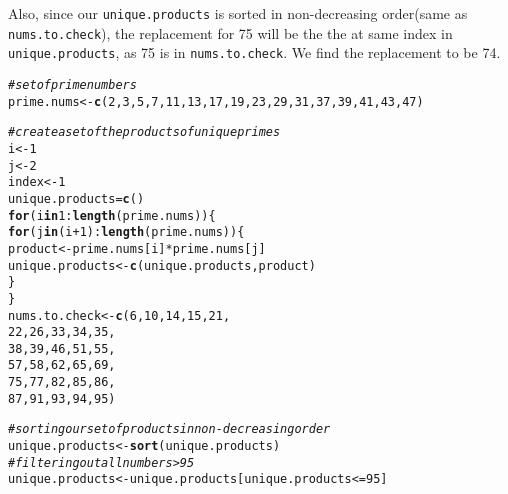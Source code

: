 \documentclass{article}\usepackage[]{graphicx}\usepackage[]{xcolor}
\makeatletter
\newcommand{\hlnum}[1]{\textcolor[rgb]{0.686,0.059,0.569}{#1}}%
\newcommand{\hlcom}[1]{\textcolor[rgb]{0.678,0.584,0.686}{\textit{#1}}}%
\newcommand{\hlopt}[1]{\textcolor[rgb]{0,0,0}{#1}}%
\newcommand{\hldef}[1]{\textcolor[rgb]{0.345,0.345,0.345}{#1}}%
\newcommand{\hlkwa}[1]{\textcolor[rgb]{0.161,0.373,0.58}{\textbf{#1}}}%
\newcommand{\hlkwb}[1]{\textcolor[rgb]{0.69,0.353,0.396}{#1}}%
\newcommand{\hlkwd}[1]{\textcolor[rgb]{0.737,0.353,0.396}{\textbf{#1}}}%
\newenvironment{kframe}{%
 \def\at@end@of@kframe{}%
 \ifinner\ifhmode%
  \def\at@end@of@kframe{\end{minipage}}%
  \begin{minipage}{\columnwidth}%
 \fi\fi%
 \def\FrameCommand##1{\hskip\@totalleftmargin \hskip-\fboxsep
 \colorbox{shadecolor}{##1}\hskip-\fboxsep
     \hskip-\linewidth \hskip-\@totalleftmargin \hskip\columnwidth}%
 \MakeFramed {\advance\hsize-\width
   \@totalleftmargin\z@ \linewidth\hsize
   \@setminipage}}%
 {\par\unskip\endMakeFramed%
 \at@end@of@kframe}
\newenvironment{knitrout}{}{} %
\makeatother
\begin{document}
\begin{enumerate}
Also, since our \texttt{unique.products} is sorted in non-decreasing order(same as \texttt{nums.to.check}), the replacement for 75 will be the the at same index in \texttt{unique.products}, as 75 is in \texttt{nums.to.check}. We find the replacement to be 74.

\begin{knitrout}\scriptsize
{}\color{fgcolor}\begin{kframe}
\begin{alltt}
\hlcom{#set of prime numbers}
\hldef{prime.nums} \hlkwb{<-} \hlkwd{c}\hldef{(}\hlnum{2}\hldef{,} \hlnum{3}\hldef{,} \hlnum{5}\hldef{,} \hlnum{7}\hldef{,} \hlnum{11}\hldef{,} \hlnum{13}\hldef{,} \hlnum{17}\hldef{,} \hlnum{19}\hldef{,} \hlnum{23}\hldef{,} \hlnum{29}\hldef{,} \hlnum{31}\hldef{,} \hlnum{37}\hldef{,} \hlnum{39}\hldef{,} \hlnum{41}\hldef{,} \hlnum{43}\hldef{,} \hlnum{47}\hldef{)}

\hlcom{#create a set of the products of unique primes}
\hldef{i} \hlkwb{<-} \hlnum{1}
\hldef{j} \hlkwb{<-} \hlnum{2}
\hldef{index} \hlkwb{<-} \hlnum{1}
\hldef{unique.products} \hlkwb{=} \hlkwd{c}\hldef{()}
\hlkwa{for} \hldef{(i} \hlkwa{in} \hlnum{1}\hlopt{:}\hlkwd{length}\hldef{(prime.nums))\{}
  \hlkwa{for} \hldef{(j} \hlkwa{in} \hldef{(i}\hlopt{+}\hlnum{1}\hldef{)}\hlopt{:}\hlkwd{length}\hldef{(prime.nums))\{}
    \hldef{product} \hlkwb{<-} \hldef{prime.nums[i]} \hlopt{*} \hldef{prime.nums[j]}
    \hldef{unique.products} \hlkwb{<-} \hlkwd{c}\hldef{(unique.products, product)}
  \hldef{\}}
\hldef{\}}
\hldef{nums.to.check}  \hlkwb{<-} \hlkwd{c}\hldef{(} \hlnum{6}\hldef{,} \hlnum{10}\hldef{,} \hlnum{14}\hldef{,} \hlnum{15}\hldef{,} \hlnum{21}\hldef{,}
                    \hlnum{22}\hldef{,} \hlnum{26}\hldef{,} \hlnum{33}\hldef{,} \hlnum{34}\hldef{,} \hlnum{35}\hldef{,}
                    \hlnum{38}\hldef{,} \hlnum{39}\hldef{,} \hlnum{46}\hldef{,} \hlnum{51}\hldef{,} \hlnum{55}\hldef{,}
                    \hlnum{57}\hldef{,} \hlnum{58}\hldef{,} \hlnum{62}\hldef{,} \hlnum{65}\hldef{,} \hlnum{69}\hldef{,}
                    \hlnum{75}\hldef{,} \hlnum{77}\hldef{,} \hlnum{82}\hldef{,} \hlnum{85}\hldef{,} \hlnum{86}\hldef{,}
                    \hlnum{87}\hldef{,} \hlnum{91}\hldef{,} \hlnum{93}\hldef{,} \hlnum{94}\hldef{,} \hlnum{95}\hldef{)}

\hlcom{#sorting our set of products in non-decreasing order}
\hldef{unique.products} \hlkwb{<-} \hlkwd{sort}\hldef{(unique.products)}
\hlcom{#filtering out all numbers > 95}
\hldef{unique.products} \hlkwb{<-} \hldef{unique.products[unique.products} \hlopt{<=} \hlnum{95}\hldef{]}


\end{alltt}
\end{kframe}
\end{knitrout}
\end{enumerate}
\end{document}
